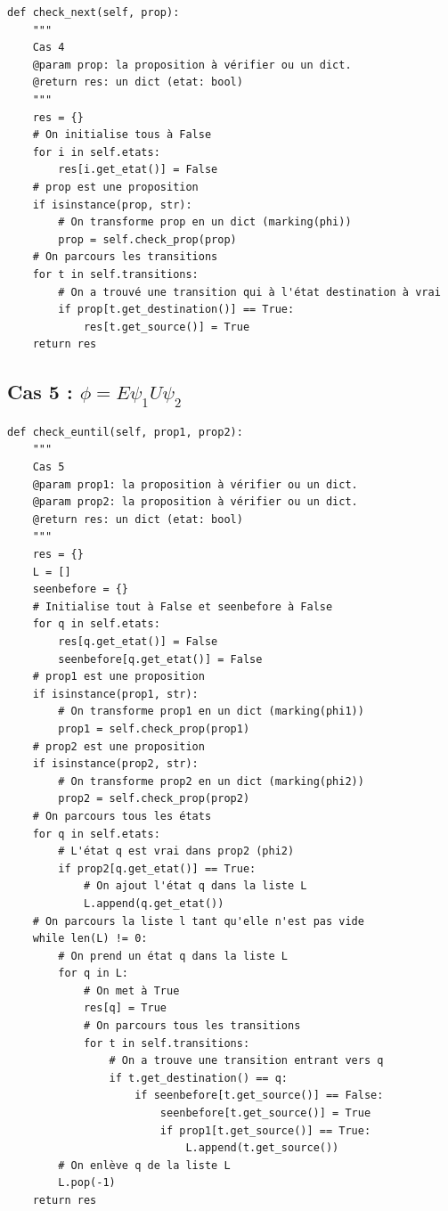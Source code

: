 \documentclass[12pt,a4paper]{report}
\begin{document}
\begin{verbatim}
def check_next(self, prop):
    """
    Cas 4
    @param prop: la proposition à vérifier ou un dict.
    @return res: un dict (etat: bool)
    """
    res = {}
    # On initialise tous à False
    for i in self.etats:
        res[i.get_etat()] = False
    # prop est une proposition
    if isinstance(prop, str):
        # On transforme prop en un dict (marking(phi))
        prop = self.check_prop(prop)
    # On parcours les transitions
    for t in self.transitions:
        # On a trouvé une transition qui à l'état destination à vrai
        if prop[t.get_destination()] == True:
            res[t.get_source()] = True
    return res
\end{verbatim}

\subsection*{Cas 5 : $\phi = E \psi_{1} U \psi_{2}$}

\begin{verbatim}
def check_euntil(self, prop1, prop2):
    """
    Cas 5
    @param prop1: la proposition à vérifier ou un dict.
    @param prop2: la proposition à vérifier ou un dict.
    @return res: un dict (etat: bool)
    """
    res = {}
    L = []
    seenbefore = {}
    # Initialise tout à False et seenbefore à False
    for q in self.etats:
        res[q.get_etat()] = False
        seenbefore[q.get_etat()] = False
    # prop1 est une proposition
    if isinstance(prop1, str):
        # On transforme prop1 en un dict (marking(phi1))
        prop1 = self.check_prop(prop1)
    # prop2 est une proposition
    if isinstance(prop2, str):
        # On transforme prop2 en un dict (marking(phi2))
        prop2 = self.check_prop(prop2)
    # On parcours tous les états
    for q in self.etats:
        # L'état q est vrai dans prop2 (phi2)
        if prop2[q.get_etat()] == True:
            # On ajout l'état q dans la liste L
            L.append(q.get_etat())
    # On parcours la liste l tant qu'elle n'est pas vide
    while len(L) != 0:
        # On prend un état q dans la liste L
        for q in L:
            # On met à True
            res[q] = True
            # On parcours tous les transitions
            for t in self.transitions:
                # On a trouve une transition entrant vers q
                if t.get_destination() == q:
                    if seenbefore[t.get_source()] == False:
                        seenbefore[t.get_source()] = True
                        if prop1[t.get_source()] == True:
                            L.append(t.get_source())
        # On enlève q de la liste L
        L.pop(-1)
    return res
\end{verbatim}
\end{document}
